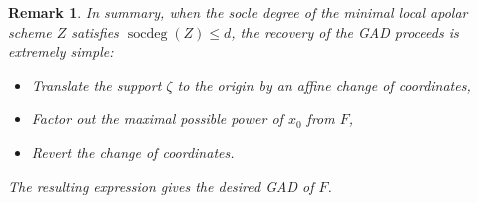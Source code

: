 \documentclass[a4paper,11p]{amsart}
\newtheorem{remark0}[defn0]{Remark}
\newenvironment{remark}{ \begin{remark0}\rm}{\end{remark0}}
\newtheorem{alg}{Algorithm}
\begin{document}
\begin{remark}
    In summary, when the socle degree of the minimal local apolar scheme $Z$ satisfies $\operatorname{socdeg}(Z) \le d$, the recovery of the GAD proceeds is extremely simple:
    \begin{itemize}
        \item Translate the support $\zeta$ to the origin by an affine change of coordinates, \item Factor out the maximal possible power of $x_0$ from $F$, 
        \item Revert the change of coordinates.
    \end{itemize}The resulting expression gives the desired GAD of $F$.
\end{remark}

\end{document}
